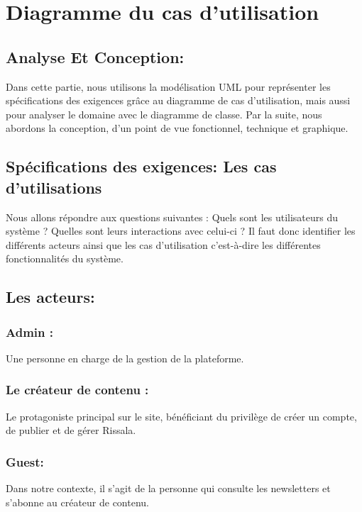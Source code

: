 \chapter{Diagramme du cas d'utilisation}


\section{Analyse Et Conception:}
Dans cette partie, nous utilisons la modélisation UML pour représenter les spécifications des
exigences grâce au diagramme de cas d’utilisation, mais aussi pour analyser le domaine avec le
diagramme de classe. Par la suite, nous abordons la conception, d’un point de vue fonctionnel,
technique et graphique. 
\section{Spécifications des exigences: Les cas d’utilisations}
Nous allons répondre aux questions suivantes : Quels sont les utilisateurs du système ? Quelles sont
leurs interactions avec celui-ci ? Il faut donc identifier les différents acteurs ainsi que les cas
d’utilisation c’est-à-dire les différentes fonctionnalités du système. 

\section{Les acteurs:}
\subsection{Admin : }
Une personne en charge de la gestion de la plateforme.
\subsection{Le créateur de contenu :}
Le protagoniste principal sur le site, bénéficiant du privilège de créer un compte, de publier et de gérer Rissala.
\subsection{Guest:}
Dans notre contexte, il s'agit de la personne qui consulte les newsletters et s'abonne au créateur de contenu.

